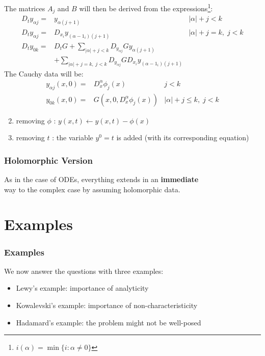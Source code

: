 \documentclass[serif,notheorems]{beamer}
\theoremstyle{definition} %
\theoremstyle{remark}
\begin{document}
\begin{frame}
The matrices $A_j$ and $B$ will then be derived from the expressions\footnote{$i(\alpha)=\min\{ i:\alpha\neq 0 \} $}:
\begin{align*}
D_t y_{\alpha j} =& y_{\alpha (j+1)} & |\alpha| + j < k \\
D_t y_{\alpha j} =& D_{x_i} y_{(\alpha-1_i)(j+1)} & |\alpha| + j = k, \; j < k\\
D_t y_{0k} =& D_tG + \sum_{|\alpha|+j < k} D_{y_{\alpha j}}G y_{\alpha (j+1)} \\
& + \sum_{|\alpha|+j = k, \; j < k} D_{y_{\alpha j}} G D_{x_i} y_{(\alpha-1_i)(j+1)}
\end{align*}
The Cauchy data will be:
\begin{align*}
y_{\alpha j}(x, 0) = & D_x^{\alpha} \phi_j(x) & j < k\\
y_{0k}(x, 0) = & G\left( x, 0, D_x^{\alpha} \phi_j(x) \right) & \lvert \alpha \rvert + j \leq k, \; j < k
\end{align*}
\end{frame}

\begin{frame}
\begin{enumerate}
\setcounter{enumi}{1}
\item removing $\phi$ : $y(x,t)\leftarrow y(x,t)-\phi (x)$
\item removing $t$ : the variable $y^0=t$ is added (with its corresponding equation)
\end{enumerate}
\end{frame}

\begin{frame}
\frametitle{Holomorphic Version}
\begin{center}
As in the case of ODEs, everything extends in an \textbf{immediate}\\
way to the complex case by assuming holomorphic data.
\end{center}
\end{frame}

\section{Examples}

\begin{frame}
\frametitle{Examples}
We now answer the questions with three examples:
\begin{itemize}
\item Lewy's example: importance of analyticity
\item Kowalevski's example: importance of non-characteristicity
\item Hadamard's example: the problem might not be well-posed
\end{itemize}
\end{frame}
\end{document}
